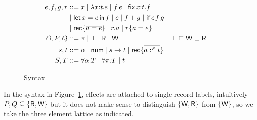 \documentclass{llncs}
\begin{document}
\begin{figure}[tp]
  \begin{align*}
    e,f,g,r
    &::= x \mid \lambda x{:}t.e \mid f\,e \mid \textsf{fix}\,x{:}t.f \\
    & \mid \textsf{let}\,x=e\,\textsf{in}\,f  \mid c \mid f+g \mid \textsf{if}\,e\,f\,g\\
    &\mid \textsf{rec}^{{}}\{ \overline{a=e}\} \mid r.a \mid r^{{}}\{a=e\} \\
    O,P,Q &::= \pi \mid \bot \mid \textsf{R} \mid \textsf{W} & \bot & \sqsubseteq\textsf{W}\sqsubset \textsf{R} \\
    s,t &::= \alpha \mid \textsf{num} \mid s \to t \mid \textsf{rec}^{{}}\{ \overline{a :^P t}\} \\
    S, T& ::= \forall \alpha. T \mid \forall \pi. T \mid t
  \end{align*}
  \caption{Syntax}
  \label{fig:syntax-3}
\end{figure}
In the syntax in Figure~\ref{fig:syntax-3}, effects are attached to single record labels, intuitively $P, Q \subseteq
\{ \textsf{R}, \textsf{W} \}$ but it does not make sense to distinguish
$\{\textsf{W}, \textsf{R}\}$ from $\{\textsf{W}\}$, so we take the three element lattice as indicated.
\end{document}
